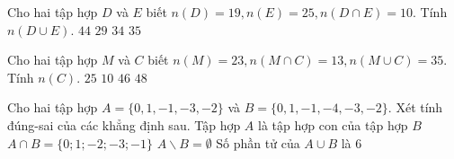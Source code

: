 \begin{ex}
 Cho hai tập hợp ${D}$ và ${E}$ biết $n(D)=19,n(E)=25, n(D\cap E)=10$. Tính $n(D\cup E)$. 
\choice
{ ${44}$ }
   { ${29}$ }
     { \True ${34}$ }
    { ${35}$ }
\end{ex}

\begin{ex}
 Cho hai tập hợp ${M}$ và ${C}$ biết $n(M)=23,n(M\cap C)=13, n(M\cup C)=35$. Tính $n(C)$. 
\choice
{ \True ${25}$ }
   { ${10}$ }
     { ${46}$ }
    { ${48}$ }
\end{ex}
\begin{ex}
 Cho hai tập hợp $A=\{{0, 1, -1, -3, -2}\}$ và $B=\{{0, 1, -1, -4, -3, -2}\}$. Xét tính đúng-sai của các khẳng định sau. 
\choiceTFt
{ \True Tập hợp ${A}$ là tập hợp con của tập hợp ${B}$ }
   { \True $A\cap B= \{{0; 1; -2; -3; -1}\}$ }
     { \True $A \backslash B = \emptyset$ }
    { \True Số phần tử của $A \cup B$ là ${6}$ }
\end{ex}

